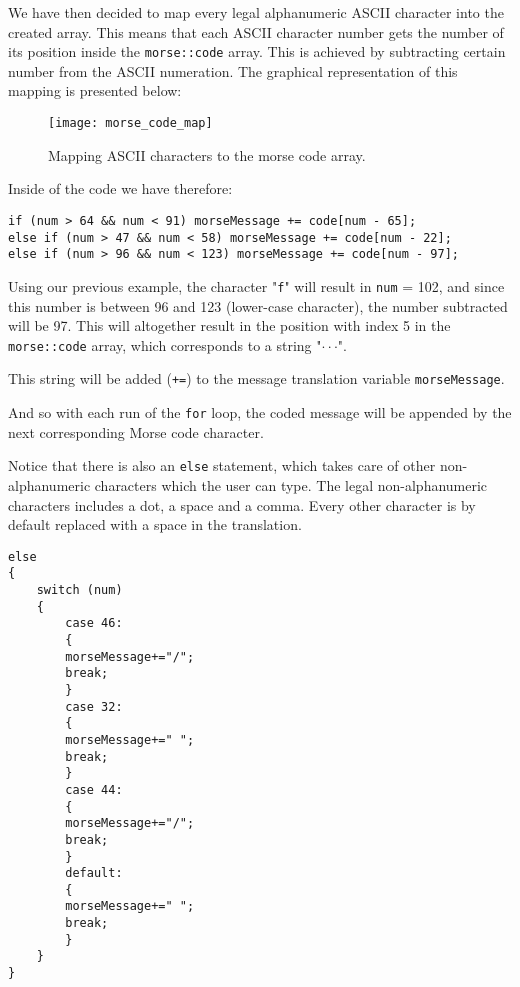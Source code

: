 \documentclass[12pt]{report}
\begin{document}
We have then decided to map every legal alphanumeric ASCII character into the created array. This means that each ASCII character number gets the number of its position inside the \verb|morse::code| array. This is achieved by subtracting certain number from the ASCII numeration. The graphical representation of this mapping is presented below:

\begin{figure}[H]
\centering\texttt{[image: morse\_code\_map]}
\caption{Mapping ASCII characters to the morse code array.}				
\label{fig:morse_code_map}
\end{figure}

Inside of the code we have therefore:

\begin{snugshade}
\begin{verbatim}
if (num > 64 && num < 91) morseMessage += code[num - 65];
else if (num > 47 && num < 58) morseMessage += code[num - 22];
else if (num > 96 && num < 123) morseMessage += code[num - 97];
\end{verbatim}
\end{snugshade}

Using our previous example, the character "\verb|f|" will result in \verb|num| = 102, and since this number is between 96 and 123 (lower-case character), the number subtracted will be 97. This will altogether result in the position with index 5 in the \verb|morse::code| array, which corresponds to a string "$\cdot\cdot$\text{-}$\cdot$". 

This string will be added (\verb|+=|) to the message translation variable \verb|morseMessage|.

And so with each run of the \verb|for| loop, the coded message will be appended by the next corresponding Morse code character.

Notice that there is also an \verb|else| statement, which takes care of other non-alphanumeric characters which the user can type. The legal non-alphanumeric characters includes a dot, a space and a comma. Every other character is by default replaced with a space in the translation.


\begin{snugshade}
\begin{verbatim}
else
{
	switch (num)
	{
		case 46:
		{
		morseMessage+="/";
		break;
		}
		case 32:
		{
		morseMessage+=" ";
		break;
		}
		case 44:
		{
		morseMessage+="/";
		break;
		}
		default:
		{
		morseMessage+=" ";
		break;
		}
	}
}
\end{verbatim}
\end{snugshade}
\end{document}
